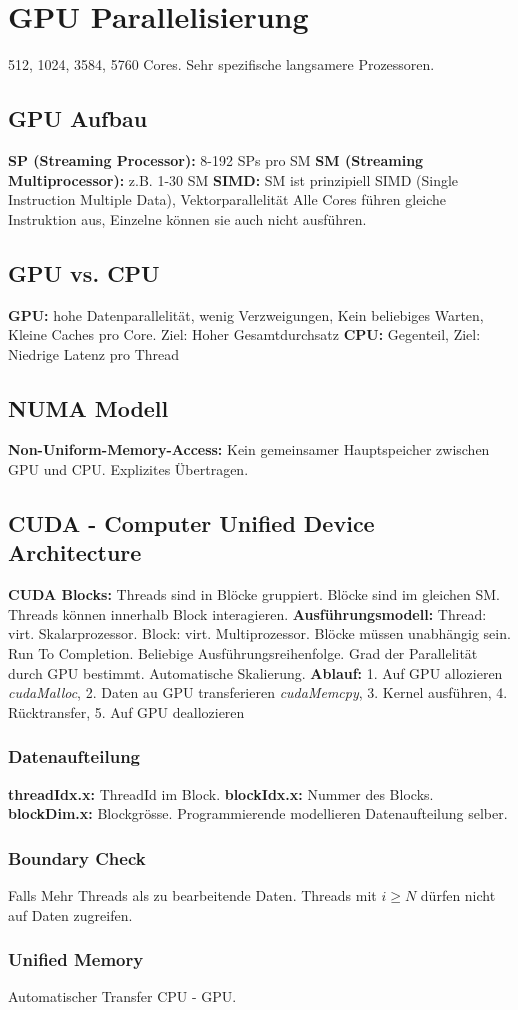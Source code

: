 \section{GPU Parallelisierung}
512, 1024, 3584, 5760 Cores. 
Sehr spezifische langsamere Prozessoren.
\subsection{GPU Aufbau}
\textbf{SP (Streaming Processor):} 8-192 SPs pro SM 
\textbf{SM (Streaming Multiprocessor):} z.B. 1-30 SM
\textbf{SIMD:} SM ist prinzipiell SIMD (Single Instruction Multiple Data), Vektorparallelität
Alle Cores führen gleiche Instruktion aus, Einzelne können sie auch nicht ausführen.

\subsection{GPU vs. CPU}
\textbf{GPU:} hohe Datenparallelität, wenig Verzweigungen, Kein beliebiges Warten, Kleine Caches pro Core. Ziel: Hoher Gesamtdurchsatz
\textbf{CPU:} Gegenteil, Ziel: Niedrige Latenz pro Thread

\subsection{NUMA Modell}
\textbf{Non-Uniform-Memory-Access:} Kein gemeinsamer Hauptspeicher zwischen GPU und CPU.
Explizites Übertragen.

\subsection{CUDA - Computer Unified Device Architecture}
\textbf{CUDA Blocks:} Threads sind in Blöcke gruppiert.
Blöcke sind im gleichen SM. Threads können innerhalb Block interagieren.
\textbf{Ausführungsmodell:}
Thread: virt. Skalarprozessor. 
Block: virt. Multiprozessor.
Blöcke müssen unabhängig sein. Run To Completion.
Beliebige Ausführungsreihenfolge.
Grad der Parallelität durch GPU bestimmt. 
Automatische Skalierung.
\textbf{Ablauf:} 1. Auf GPU allozieren \textit{cudaMalloc}, 
2. Daten au GPU transferieren \textit{cudaMemcpy},
3. Kernel ausführen,
4. Rücktransfer, 
5. Auf GPU deallozieren

\subsubsection{Datenaufteilung}
\textbf{threadIdx.x:} ThreadId im Block.
\textbf{blockIdx.x:} Nummer des Blocks.
\textbf{blockDim.x:} Blockgrösse.
Programmierende modellieren Datenaufteilung selber.

\subsubsection{Boundary Check}
Falls Mehr Threads als zu bearbeitende Daten.
Threads mit $i \geq N$ dürfen nicht auf Daten zugreifen.

\subsubsection{Unified Memory}
Automatischer Transfer CPU - GPU.

